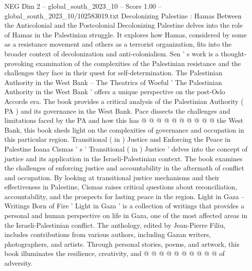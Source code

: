 \begin{textsample}{NEG Dim 2 – global\_south\_2023\_10 – Score 1.00 – global\_south\_2023\_10/102583019.txt}
Decolonizing Palestine : Hamas Between the Anticolonial and the Postcolonial Decolonizing Palestine delves into the role of Hamas in the Palestinian struggle.
It explores how Hamas, considered by some as a resistance movement and others as a terrorist organization, fits into the broader context of decolonization and anti-colonialism.
Sen ' s work is a thought-provoking examination of the complexities of the Palestinian resistance and the challenges they face in their quest for self-determination.
The Palestinian Authority in the West Bank -- The Theatrics of Woeful ' The Palestinian Authority in the West Bank ' offers a unique perspective on the post-Oslo Accords era.
The book provides a critical analysis of the Palestinian Authority ( PA ) and its governance in the West Bank.
Pace dissects the challenges and limitations faced by the PA and how this has @ @ @ @ @ @ @ @ @ @ the West Bank, this book sheds light on the complexities of governance and occupation in this particular region.
Transitional ( in ) Justice and Enforcing the Peace in Palestine Ioana Cismas ' s ' Transitional ( in ) Justice ' delves into the concept of justice and its application in the Israeli-Palestinian context.
The book examines the challenges of enforcing justice and accountability in the aftermath of conflict and occupation.
By looking at transitional justice mechanisms and their effectiveness in Palestine, Cismas raises critical questions about reconciliation, accountability, and the prospects for lasting peace in the region.
Light in Gaza -- Writings Born of Fire ' Light in Gaza ' is a collection of writings that provides a personal and human perspective on life in Gaza, one of the most affected areas in the Israeli-Palestinian conflict.
The anthology, edited by Jean-Pierre Filiu, includes contributions from various authors, including Gazan writers, photographers, and artists.
Through personal stories, poems, and artwork, this book illuminates the resilience, creativity, and @ @ @ @ @ @ @ @ @ @ of adversity.

\end{textsample}
